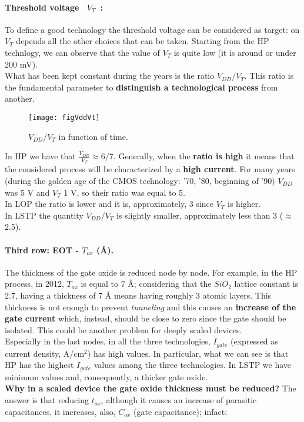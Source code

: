 \documentclass[a4paper, 12pt, twoside, openright]{report}
\begin{document}
\paragraph{Threshold voltage~  $V_{T}$~:} To define a good technology the threshold voltage can be considered as target: on $V_{T}$ depends all the other choices that can be taken. Starting from the HP technlogy, we can observe that the value of $V_{T}$ is quite low (it is around or under 200 mV).\\
What has been kept constant during the years is the ratio $V_{DD}/V_{T}$. This ratio is the fundamental parameter to \textbf{distinguish a technological process} from another.

	\begin{figure}[H]
	\centering
	\texttt{[image: figVddVt]}
	\caption{$V_{DD}/V_{T}$ in function of time.}
	\label{tau}
	\end{figure}

In HP we have that $\frac{V_{DD}}{V_{T}} \approx 6/7$. Generally, when the \textbf{ratio is high} it means that the considered process will be characterized by a \textbf{high current}. For many years (during the golden age of the CMOS technology: '70, '80, beginning of '90) $V_{DD}$ was 5 V and $V_{T}$ 1 V, so their ratio was equal to 5.\\
In LOP the ratio is lower and it is, approximately, 3 since $V_{T}$ is higher.\\
In LSTP the quantity $V_{DD}/V_{T}$ is slightly smaller, approximately less than 3 ($\approx$ 2.5).

\paragraph{Third row: EOT - $T_{ox}$ (\r{A}).} The thickness of the gate oxide is reduced node by node. For example, in the HP process, in 2012, $T_{ox}$ is equal to 7 \r{A}; considering that the $SiO_{2}$ lattice constant is 2.7, having a thickness of 7 \r{A} means having roughly 3 atomic layers. This thickness is not enough to prevent \emph{tunneling} and this causes an \textbf{increase of the gate current} which, instead, should be close to zero since the gate should be isolated. This could be another problem for deeply scaled devices.\\
Especially in the last nodes, in all the three technologies, $I_{gate}$ (expressed as current density, A/cm$^{2}$) has high values. In particular, what we can see is that HP has the highest $I_{gate}$ values among the three technologies. In LSTP we have minimum values and, consequently, a thicker gate oxide.\\
\textbf{Why in a scaled device the gate oxide thickness must be reduced?} The answer is that reducing $t_{ox}$, although it causes an increase of parasitic capacitances, it increases, also, $C_{ox}$ (gate capacitance); infact:
\end{document}
